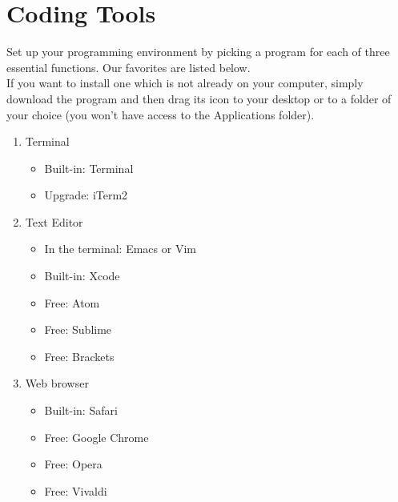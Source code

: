 \documentclass{42-en}
\begin{document}

\chapter{Coding Tools}

Set up your programming environment by picking a program for each of three essential functions. Our favorites are listed below.\\

If you want to install one which is not already on your computer, simply download the program and then drag its icon to your desktop or to a folder of your choice (you won't have access to the Applications folder). 

\begin{enumerate}
	\item Terminal
	\begin{itemize}
		\item Built-in: Terminal
		\item Upgrade: iTerm2
	\end{itemize}
	\item Text Editor
	\begin{itemize}
		\item In the terminal: Emacs or Vim
		\item Built-in: Xcode
		\item Free: Atom
		\item Free: Sublime
		\item Free: Brackets
	\end{itemize}
	\item Web browser
	\begin{itemize}
		\item Built-in: Safari
		\item Free: Google Chrome
		\item Free: Opera
		\item Free: Vivaldi
	\end{itemize}
\end{enumerate}

\end{document}
